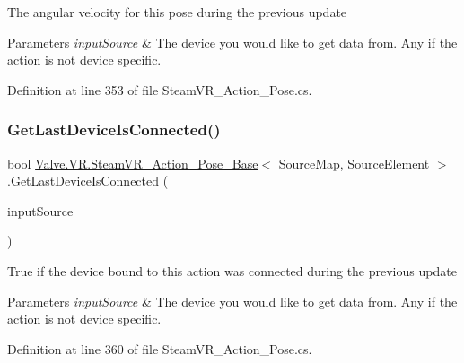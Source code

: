 The angular velocity for this pose during the previous update 


\begin{DoxyParams}{Parameters}
{\em input\+Source} & The device you would like to get data from. Any if the action is not device specific.\\
\hline
\end{DoxyParams}


Definition at line 353 of file Steam\+V\+R\+\_\+\+Action\+\_\+\+Pose.\+cs.

\mbox{\label{class_valve_1_1_v_r_1_1_steam_v_r___action___pose___base_a55d19b1a7931ed13d689a7c3acb31581}} 
\subsubsection{\texorpdfstring{GetLastDeviceIsConnected()}{GetLastDeviceIsConnected()}}
{\footnotesize\ttfamily bool \mbox{\hyperlink{class_valve_1_1_v_r_1_1_steam_v_r___action___pose___base}{Valve.\+V\+R.\+Steam\+V\+R\+\_\+\+Action\+\_\+\+Pose\+\_\+\+Base}}$<$ Source\+Map, Source\+Element $>$.Get\+Last\+Device\+Is\+Connected (\begin{DoxyParamCaption}\item[{\mbox{\hyperlink{namespace_valve_1_1_v_r_a82e5bf501cc3aa155444ee3f0662853f}{Steam\+V\+R\+\_\+\+Input\+\_\+\+Sources}}}]{input\+Source }\end{DoxyParamCaption})}



True if the device bound to this action was connected during the previous update 


\begin{DoxyParams}{Parameters}
{\em input\+Source} & The device you would like to get data from. Any if the action is not device specific.\\
\hline
\end{DoxyParams}


Definition at line 360 of file Steam\+V\+R\+\_\+\+Action\+\_\+\+Pose.\+cs.

